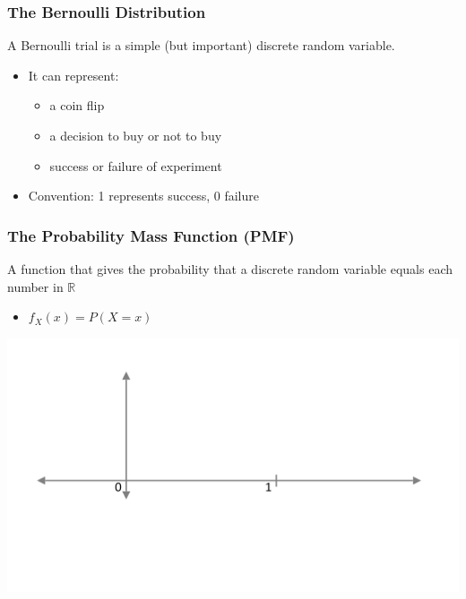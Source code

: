 \documentclass[12pt, block=fill]{beamer}
\newcommand{\R}{\mathbb{R}}
\begin{document}
\begin{frame}[t]
  \frametitle{The Bernoulli Distribution}
   
  A Bernoulli trial is a simple (but important) discrete random
  variable.
  \begin{itemize}
  \item It can represent: 
  \begin{itemize}
\item a coin flip 
\item a decision to buy or not to buy
\item success or
    failure of experiment
\end{itemize}

  \item Convention: 1 represents success, 0 failure
  \end{itemize}
 
   
    
\end{frame}
 
  
\begin{frame}[t]
  \frametitle{The Probability Mass Function (PMF)}
   
  A function that gives the probability that a discrete random
  variable equals each number in $\R$

  \begin{itemize}
  \item $f_X(x) = P(X = x)$
  \end{itemize}
  \vspace{.5cm} \includegraphics[width= \textwidth ]{figures/axes}
 
   
\end{frame}
 
\end{document}
